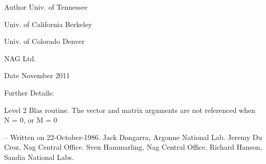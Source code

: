 \begin{DoxyAuthor}{Author}
Univ. of Tennessee 

Univ. of California Berkeley 

Univ. of Colorado Denver 

N\+A\+G Ltd. 
\end{DoxyAuthor}
\begin{DoxyDate}{Date}
November 2011 
\end{DoxyDate}
\begin{DoxyParagraph}{Further Details\+: }
\begin{DoxyVerb}  Level 2 Blas routine.
  The vector and matrix arguments are not referenced when N = 0, or M = 0

  -- Written on 22-October-1986.
     Jack Dongarra, Argonne National Lab.
     Jeremy Du Croz, Nag Central Office.
     Sven Hammarling, Nag Central Office.
     Richard Hanson, Sandia National Labs.\end{DoxyVerb}
 
\end{DoxyParagraph}
